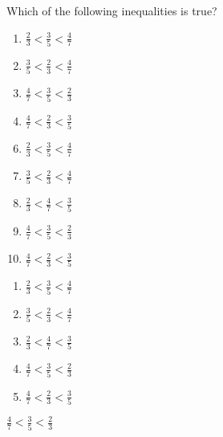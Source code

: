 

  Which of the following inequalities is true?


\ifsat
	\begin{enumerate}[label=\Alph*)]
		\item   $\frac{2}{3}<\frac{3}{5}<\frac{4}{7}$
		\item  $\frac{3}{5}<\frac{2}{3}<\frac{4}{7}$
		\item  $\frac{4}{7}<\frac{3}{5}<\frac{2}{3}$%
		\item  $\frac{4}{7}<\frac{2}{3}<\frac{3}{5}$
	\end{enumerate}
\else
\fi

\ifacteven
	\begin{enumerate}[label=\textbf{\Alph*.},itemsep=\fill,align=left]
		\setcounter{enumii}{5}
		\item   $\frac{2}{3}<\frac{3}{5}<\frac{4}{7}$
		\item  $\frac{3}{5}<\frac{2}{3}<\frac{4}{7}$
		\item  $\frac{2}{3}<\frac{4}{7}<\frac{3}{5}$
		\addtocounter{enumii}{1}
		\item  $\frac{4}{7}<\frac{3}{5}<\frac{2}{3}$%
		\item  $\frac{4}{7}<\frac{2}{3}<\frac{3}{5}$
	\end{enumerate}
\else
\fi

\ifactodd
	\begin{enumerate}[label=\textbf{\Alph*.},itemsep=\fill,align=left]
		\item   $\frac{2}{3}<\frac{3}{5}<\frac{4}{7}$
		\item  $\frac{3}{5}<\frac{2}{3}<\frac{4}{7}$
		\item  $\frac{2}{3}<\frac{4}{7}<\frac{3}{5}$
		\item  $\frac{4}{7}<\frac{3}{5}<\frac{2}{3}$%
		\item  $\frac{4}{7}<\frac{2}{3}<\frac{3}{5}$
	\end{enumerate}
\else
\fi

\ifgridin
  $\frac{4}{7}<\frac{3}{5}<\frac{2}{3}$%
		
\else
\fi


